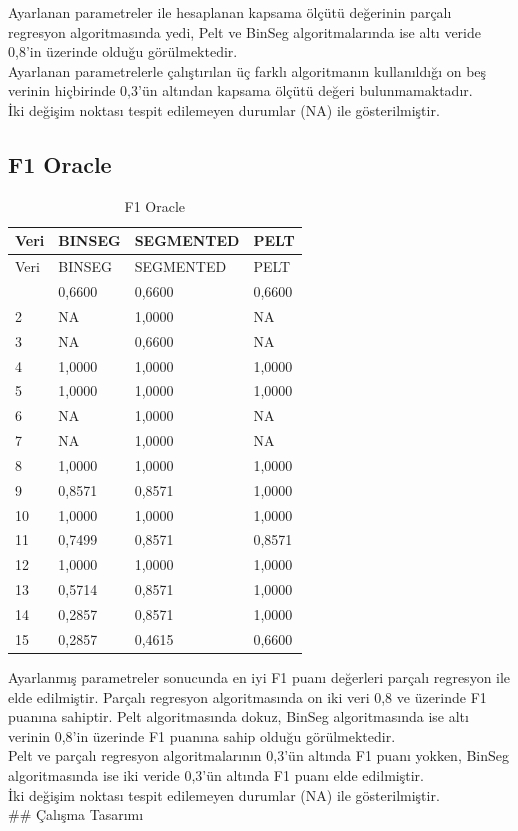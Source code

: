 \documentclass[12pt,twoside]{deuthesis}
\begin{document}
Ayarlanan parametreler ile hesaplanan kapsama ölçütü değerinin parçalı regresyon algoritmasında yedi, Pelt ve BinSeg algoritmalarında ise altı veride 0,8'in üzerinde olduğu görülmektedir.\\
Ayarlanan parametrelerle çalıştırılan üç farklı algoritmanın kullanıldığı on beş verinin hiçbirinde 0,3'ün altından kapsama ölçütü değeri bulunmamaktadır.\\
İki değişim noktası tespit edilemeyen durumlar (NA) ile gösterilmiştir.

\hypertarget{f1-oracle-2}{%
\subsection{F1 Oracle}\label{f1-oracle-2}}

\begin{longtable}[]{@{}llll@{}}
\caption{\label{tab:nvar12} F1 Oracle}\tabularnewline
\toprule\noalign{}
Veri & BINSEG & SEGMENTED & PELT \\
\midrule\noalign{}
\endfirsthead
\toprule\noalign{}
Veri & BINSEG & SEGMENTED & PELT \\
\midrule\noalign{}
\endhead
\bottomrule\noalign{}
\endlastfoot
1 & 0,6600 & 0,6600 & 0,6600 \\
2 & NA & 1,0000 & NA \\
3 & NA & 0,6600 & NA \\
4 & 1,0000 & 1,0000 & 1,0000 \\
5 & 1,0000 & 1,0000 & 1,0000 \\
6 & NA & 1,0000 & NA \\
7 & NA & 1,0000 & NA \\
8 & 1,0000 & 1,0000 & 1,0000 \\
9 & 0,8571 & 0,8571 & 1,0000 \\
10 & 1,0000 & 1,0000 & 1,0000 \\
11 & 0,7499 & 0,8571 & 0,8571 \\
12 & 1,0000 & 1,0000 & 1,0000 \\
13 & 0,5714 & 0,8571 & 1,0000 \\
14 & 0,2857 & 0,8571 & 1,0000 \\
15 & 0,2857 & 0,4615 & 0,6600 \\
\end{longtable}

Ayarlanmış parametreler sonucunda en iyi F1 puanı değerleri parçalı regresyon ile elde edilmiştir. Parçalı regresyon algoritmasında on iki veri 0,8 ve üzerinde F1 puanına sahiptir. Pelt algoritmasında dokuz, BinSeg algoritmasında ise altı verinin 0,8'in üzerinde F1 puanına sahip olduğu görülmektedir.\\
Pelt ve parçalı regresyon algoritmalarının 0,3'ün altında F1 puanı yokken, BinSeg algoritmasında ise iki veride 0,3'ün altında F1 puanı elde edilmiştir.\\
İki değişim noktası tespit edilemeyen durumlar (NA) ile gösterilmiştir.\\
\#\# Çalışma Tasarımı
\end{document}
